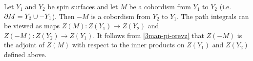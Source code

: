 Let $Y_1$ and $Y_2$ be spin surfaces and let $M$ be a cobordism from $Y_1$ to $Y_2$
(i.e.\ $\partial M = Y_2\cup -Y_1$).
Then $-M$ is a cobordism from $Y_2$ to $Y_1$.
The path integrals can be viewed as maps $Z(M): Z(Y_1)\to Z(Y_2)$ and $Z(-M):Z(Y_2)\to Z(Y_1)$.
It follows from \eqref{3man-pi-orevz} that $Z(-M)$ is the adjoint of $Z(M)$ with respect to the inner products on $Z(Y_1)$
and $Z(Y_2)$ defined above.





%



